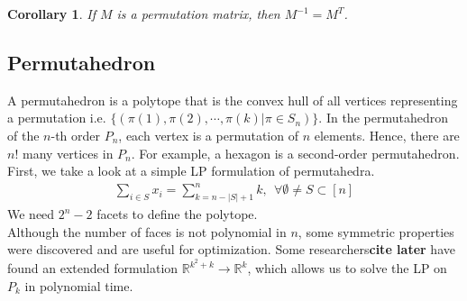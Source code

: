 \documentclass[12pt,letterpaper]{article}
\newcommand*{\R}{\mathbb{R}}
\newtheorem{corollary}[theorem]{Corollary}
\begin{document}
\begin{corollary}
    \label{cor:inverse}
    If $M$ is a permutation matrix, then $M^{-1} = M^T$.
\end{corollary}


\subsection{Permutahedron}
A permutahedron is a polytope that is the convex hull of all vertices representing a permutation i.e. $\{(\pi(1), \pi(2), \cdots, \pi(k) | \pi \in S_n) \}$. \cite{doi:10.1137/0122054}
In the permutahedron of the $n$-th order $P_n$, each vertex is a permutation of $n$ elements.
Hence, there are $n!$ many vertices in $P_n$. For example, a hexagon is a second-order permutahedron. 
First, we take a look at a simple LP formulation of permutahedra. 
\begin{align*}
    \sum_{i \in S} x_i = \sum_{k = n - |S| + 1}^n k, \ \ \forall \emptyset \neq S \subset [n]
\end{align*}
We need $2^n - 2$ facets to define the polytope.
\\
Although the number of faces is not polynomial in $n$,
some symmetric properties were discovered and are useful for optimization. Some researchers\textbf{cite later}
have found an extended formulation $\R^{k^2+k} \rightarrow \R^{k}$, which allows us 
to solve the LP on $P_k$ in polynomial time. 
\end{document}
